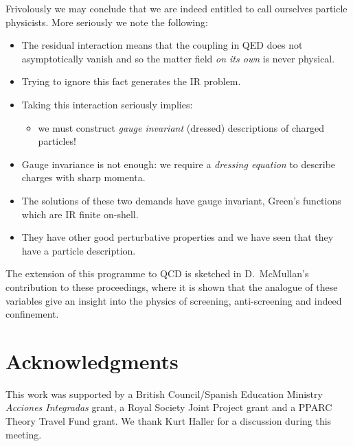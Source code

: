 \documentclass[12pt,a4paper]{article}
\begin{document}
Frivolously we may conclude that we are indeed entitled to call ourselves
particle physicists. More seriously we note the following:
\begin{itemize}
  \item The residual interaction means that the coupling in QED does not asymptotically vanish and so
  the matter field \emph{on its own} is never physical.
  \item Trying to ignore this fact generates the IR problem.
  \item Taking this interaction seriously implies:
\begin{itemize}
  \item we must construct \emph{gauge invariant} (dressed) descriptions of charged particles!
\end{itemize}
 \item Gauge invariance is not enough: we require a \emph{dressing equation} to describe charges
 with sharp momenta.
 \item The solutions of these two demands have gauge invariant, Green's functions which are  IR finite on-shell.
 \item They have other good perturbative properties and we have seen that they have a particle description.
\end{itemize}
The extension of this programme to QCD is sketched in D.~McMullan's contribution to these proceedings,
where it is shown that the analogue of these variables give an insight into the physics of
screening, anti-screening and indeed confinement.


\section*{Acknowledgments}
This work was supported by a
British Council/Spanish Education Ministry \textit{Acciones
Integradas} grant, a Royal Society Joint Project grant and a PPARC
Theory Travel Fund grant. We thank
Kurt Haller for a discussion during this meeting.
\end{document}

